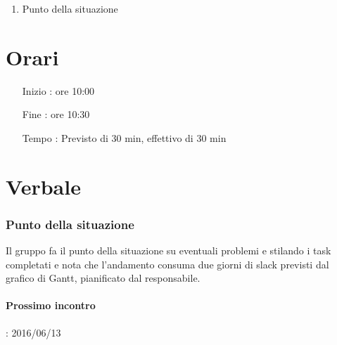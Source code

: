\begin{enumerate}
\item Punto della situazione
\end{enumerate}

\section{Orari}

\begin{itemize}
\item[Inizio]: ore 10:00
\item[Fine]: ore 10:30
\item[Tempo]: Previsto di 30 min, effettivo di 30 min

\end{itemize}

\section{Verbale}

\subsubsection{Punto della situazione}
Il gruppo fa il punto della situazione su eventuali problemi e stilando i task completati e nota che l'andamento consuma due giorni di slack previsti dal grafico di Gantt, pianificato dal responsabile.
\paragraph*{Prossimo incontro}: 2016/06/13


